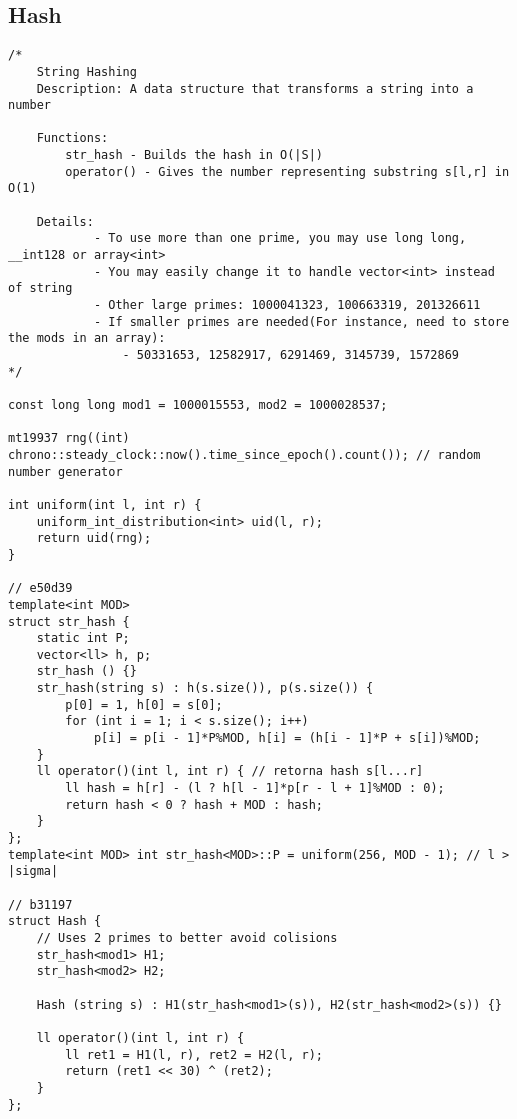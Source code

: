 \documentclass{article}
\begin{document}
\subsection{Hash}
\begin{verbatim}
/*
    String Hashing
    Description: A data structure that transforms a string into a number

    Functions:
        str_hash - Builds the hash in O(|S|)
        operator() - Gives the number representing substring s[l,r] in O(1)

    Details:
            - To use more than one prime, you may use long long, __int128 or array<int>
            - You may easily change it to handle vector<int> instead of string
            - Other large primes: 1000041323, 100663319, 201326611
            - If smaller primes are needed(For instance, need to store the mods in an array):
                - 50331653, 12582917, 6291469, 3145739, 1572869
*/

const long long mod1 = 1000015553, mod2 = 1000028537;

mt19937 rng((int) chrono::steady_clock::now().time_since_epoch().count()); // random number generator

int uniform(int l, int r) {
    uniform_int_distribution<int> uid(l, r);
    return uid(rng);
}

// e50d39
template<int MOD> 
struct str_hash {
    static int P;
    vector<ll> h, p;
    str_hash () {}
    str_hash(string s) : h(s.size()), p(s.size()) {
        p[0] = 1, h[0] = s[0];
        for (int i = 1; i < s.size(); i++)
            p[i] = p[i - 1]*P%MOD, h[i] = (h[i - 1]*P + s[i])%MOD;
    }
    ll operator()(int l, int r) { // retorna hash s[l...r]
        ll hash = h[r] - (l ? h[l - 1]*p[r - l + 1]%MOD : 0);
        return hash < 0 ? hash + MOD : hash;
    }
};
template<int MOD> int str_hash<MOD>::P = uniform(256, MOD - 1); // l > |sigma|

// b31197
struct Hash {
    // Uses 2 primes to better avoid colisions
    str_hash<mod1> H1;
    str_hash<mod2> H2;
 
    Hash (string s) : H1(str_hash<mod1>(s)), H2(str_hash<mod2>(s)) {}
 
    ll operator()(int l, int r) {
        ll ret1 = H1(l, r), ret2 = H2(l, r);
        return (ret1 << 30) ^ (ret2);
    }
};\end{verbatim}
\end{document}
